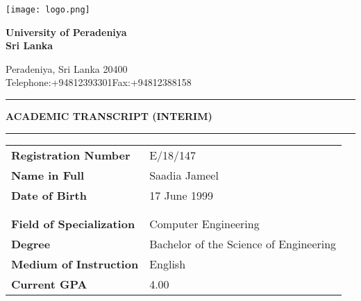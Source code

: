 \documentclass[12pt]{article}
\begin{document}
\noindent
\begin{minipage}[H]{0.17\linewidth}
\centering
\texttt{[image: logo.png]}
\end{minipage}%
\hfill
  \begin{minipage}[H]{0.8\linewidth}
{\fontsize{28}{30}\selectfont \textbf{University of Peradeniya\\Sri Lanka}}

\Large Peradeniya, Sri Lanka 20400\\
{\fontsize{12}{30}\selectfont Telephone:+94812393301\hfill Fax:+94812388158}


  \end{minipage}

\vspace{10pt}
\noindent\rule{\textwidth}{1pt}
\vspace{-15pt}
\begin{center}
{\fontsize{21}{30}\selectfont \textbf{ACADEMIC TRANSCRIPT (INTERIM)}}
\end{center}

\vspace{-12.5pt}

\noindent\rule{\textwidth}{1pt}

\begin{table}[H]
\begin{tabularx}{\textwidth}{Xl}
\textbf{Registration Number} & E/18/147 \\
\textbf{Name in Full} & Saadia Jameel \\
\textbf{Date of Birth} & 17 June 1999 \\
\\
\\

\textbf{Field of Specialization} & Computer Engineering \\
\textbf{Degree} & Bachelor of the Science of Engineering \\
\textbf{Medium of Instruction} & English \\
\textbf{Current GPA} & 4.00 \\
\end{tabularx}
\end{table}

\vspace{-15pt}
\end{document}

